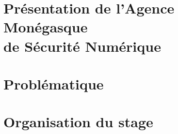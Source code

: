 
\section{Présentation de l'Agence Monégasque\\de Sécurité Numérique\\}
\label{chap1:section1}
{\fontsize{14pt}{16pt}\selectfont
    
}

\newpage

\section{Problématique}
\label{chap1:section2}
{\fontsize{14pt}{16pt}\selectfont
    
}

\newpage

\section{Organisation du stage}
\label{chap1:section3}
{\fontsize{14pt}{16pt}\selectfont
    
}






